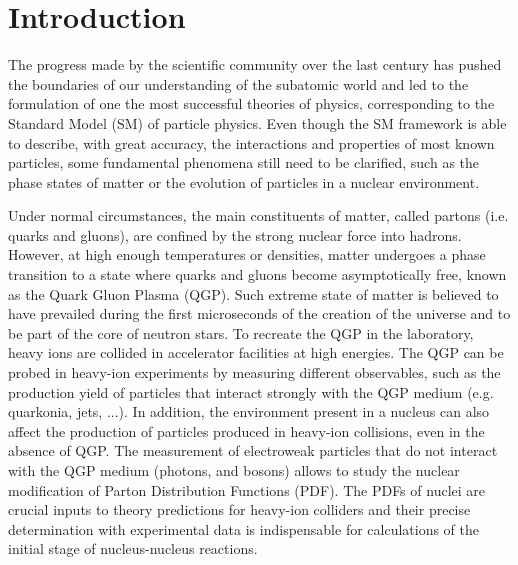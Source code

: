 \let\textcircled=\pgftextcircled
\chapter*{Introduction} \label{sec:Introduction}

The progress made by the scientific community over the last century has pushed the boundaries of our understanding of the subatomic world and led to the formulation of one the most successful theories of physics, corresponding to the Standard Model (SM) of particle physics. Even though the SM framework is able to describe, with great accuracy, the interactions and properties of most known particles, some fundamental phenomena still need to be clarified, such as the phase states of matter or the evolution of particles in a nuclear environment.

Under normal circumstances, the main constituents of matter, called partons (i.e. quarks and gluons), are confined by the strong nuclear force into hadrons. However, at high enough temperatures or densities, matter undergoes a phase transition to a state where quarks and gluons become asymptotically free, known as the Quark Gluon Plasma (QGP). Such extreme state of matter is believed to have prevailed during the first microseconds of the creation of the universe and to be part of the core of neutron stars. To recreate the QGP in the laboratory, heavy ions are collided in accelerator facilities at high energies. The QGP can be probed in heavy-ion experiments by measuring different observables, such as the production yield of particles that interact strongly with the QGP medium (e.g. quarkonia, jets, ...). In addition, the environment present in a nucleus can also affect the production of particles produced in heavy-ion collisions, even in the absence of QGP. The measurement of electroweak particles that do not interact with the QGP medium (photons, \Z and \Wb bosons) allows to study the nuclear modification of Parton Distribution Functions (PDF). The PDFs of nuclei are crucial inputs to theory predictions for heavy-ion colliders and their precise determination with experimental data is indispensable for calculations of the initial stage of nucleus-nucleus reactions.

